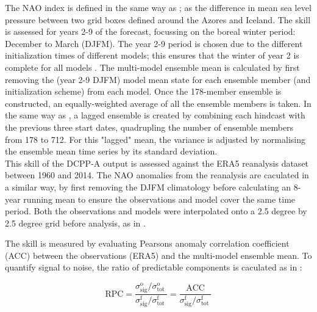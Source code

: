 \documentclass{article}
\begin{document}
The NAO index is defined in the same way as \cite{smith2020north}; as the difference in mean sea level pressure between two grid boxes defined around the Azores and Iceland. The skill is assessed for years 2-9 of the forecast, focussing on the boreal winter period: December to March (DJFM). The year 2-9 period is chosen due to the different initialization times of different models; this ensures that the winter of year 2 is complete for all models \parencite{marcheggiani2023decadal}. The multi-model ensemble mean is calculated by first removing the (year 2-9 DJFM) model mean state for each ensemble member (and initialization scheme) from each model. Once the 178-member ensemble is constructed, an equally-weighted average of all the ensemble members is taken. In the same way as \cite{smith2020north,marcheggiani2023decadal}, a lagged ensemble is created by combining each hindcast with the previous three start dates, quadrupling the number of ensemble members from 178 to 712. For this "lagged" mean, the variance is adjusted by normalising the ensemble mean time series by its standard deviation.\\

This skill of the DCPP-A output is assessed against the ERA5 reanalysis dataset between 1960 and 2014.
The NAO anomalies from the reanalysis are caculated in a similar way, by first removing the DJFM climatology before calculating an 8-year running mean to ensure the observations and model cover the same time period. Both the observations and models were interpolated onto a 2.5 degree by 2.5 degree grid before analysis, as in \cite{marcheggiani2023decadal}.

The skill is measured by evaluating Pearsons anomaly correlation coefficient (ACC) between the observations (ERA5) and the multi-model ensemble mean. To quantify signal to noise, the ratio of predictable components is caculated as in \cite{smith2020north,marcheggiani2023decadal}:

\begin{equation}
    \text{RPC}=\frac{\sigma_{\mathrm{sig}}^{\mathrm{o}} / \sigma_{\text {tot }}^{\mathrm{o}}}{\sigma_{\mathrm{sig}}^{\mathrm{f}} / \sigma_{\text {tot }}^{\mathrm{f}}}=\frac{\mathrm{ACC}}{\sigma_{\mathrm{sig}}^{\mathrm{f}} / \sigma_{\text {tot }}^{\mathrm{f}}}
    \label{eq:rpc}
\end{equation}
\end{document}

